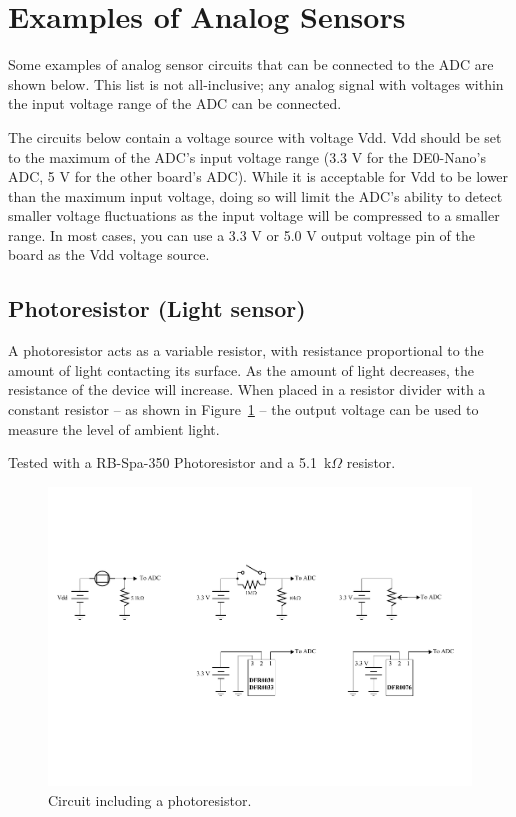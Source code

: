 \documentclass[11pt, twoside, pdftex]{article}
\begin{document}
\section{Examples of Analog Sensors}
\label{sec:analog_sensor_examples}

Some examples of analog sensor circuits that can be connected to the ADC are shown below. This list is not all-inclusive; any analog signal with voltages within the input voltage range of the ADC can be connected.  

The circuits below contain a voltage source with voltage Vdd. Vdd should be set to the maximum of the ADC's input voltage range (3.3 V for the DE0-Nano's ADC, 5 V for the other board's ADC). While it is acceptable for Vdd to be lower than the maximum input voltage, doing so will limit the ADC's ability to detect smaller voltage fluctuations as the input voltage will be compressed to a smaller range. In most cases, you can use a 3.3 V or 5.0 V output voltage pin of the board as the Vdd voltage source. %

\pagebreak

\subsection{Photoresistor (Light sensor)}
A photoresistor acts as a variable resistor, with resistance proportional to the amount of light contacting its surface. As the amount of light decreases, the resistance of the device will increase. When placed in a resistor divider with a constant resistor -- as shown in Figure~\ref{fig:light} -- the output voltage can be used to measure the level of ambient light.

Tested with a {\sf RB-Spa-350} Photoresistor and a 5.1~k$\Omega$ resistor.

\begin{figure} [H]
\begin{center}
\includegraphics{figures/light_sensor.pdf}
\end{center}
\caption{Circuit including a photoresistor.}
\label{fig:light}
\end{figure}
\end{document}
